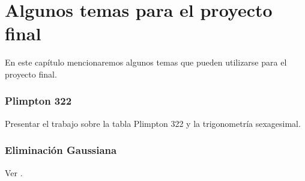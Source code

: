 \chapter{Algunos temas para el proyecto final}

\pagestyle{plain}
\fancyhf{}
\fancyfoot[CE,CO]{\leftmark}
\fancyfoot[LE,RO]{\thepage}


En este capítulo mencionaremos algunos temas
que pueden utilizarse para el proyecto final. 

\subsection*{Plimpton 322}

Presentar el trabajo \cite{MR3716328} sobre la tabla Plimpton 322 y
la trigonometría sexagesimal. 

\subsection*{Eliminación Gaussiana}

Ver \cite{MR2775854}. 
